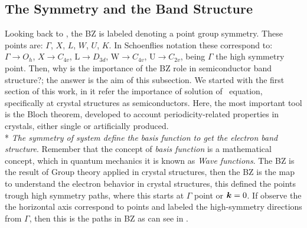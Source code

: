 \subsection{The Symmetry and the Band Structure}
\label{subsec:chapter-2-brillouin-bandstructure}
\vspace{-10mm}
Looking back  to , the \gls{BZ} is labeled
denoting a point group symmetry. These points are:  $\Gamma$, $X$, $L$, $W$, $U$, $K$.  In Schoenflies notation these correspond to: $\Gamma\to O_{h}$, $X\to C_{4v}$, $\mathrm{L}\to D_{3d}$, $\mathrm{W}\to C_{4v}$, $\mathrm{U}\to C_{2v}$, being $\Gamma$ the high symmetry point. Then, why is the importance of the \gls{BZ} role in semiconductor band structure?; the answer is the aim of this subsection. We started with the first section of this work, in it refer the importance of solution of \sch\,  equation, specifically at crystal structures as semiconductors. Here, the most important tool is the Bloch theorem, developed to account periodicity-related properties in crystals, either single or artificially produced.\\*
\emph{The symmetry of system define the basis function to get the electron band structure}\cite{dresselhaus2007group,cardona2005fundamentals,parmenter1955symmetry,butcher2013crystalline}.  Remember that the concept of \emph{basis function} is a mathematical concept, which in quantum mechanics it is known as \emph{Wave functions}. 
The \gls{BZ} is the result of Group theory applied in crystal structures, then the \gls{BZ} is the map to understand the electron behavior in crystal structures, this defined the \ks points trough high symmetry paths, where this starts at $\Gamma$ point or $\boldsymbol{k} =0$.  If observe the  the horizontal axis correspond to \ks points and labeled the high-symmetry directions from $\Gamma$, then this is the \ks paths in \gls{BZ} as can see in . 

